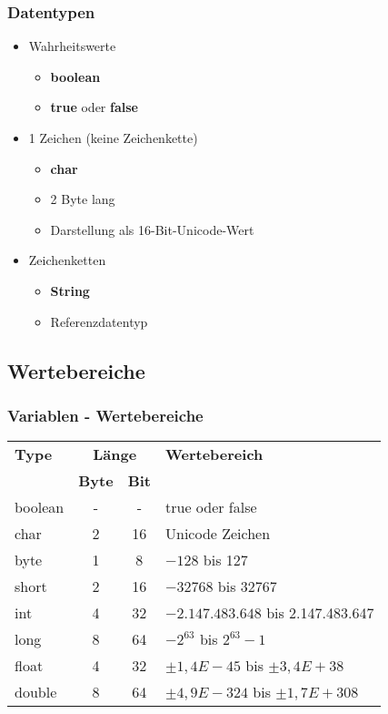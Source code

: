 \documentclass[final]{beamer}
\newcommand{\keyWord}[1]{\textbf{#1}}
\begin{document}
\begin{frame}[fragile]
  \frametitle{Datentypen}
  \begin{itemize}
    \item{Wahrheitswerte}
    \begin{itemize}
      \item{\keyWord{boolean}}
      \item{\keyWord{true} oder \keyWord{false}}
    \end{itemize}
  \end{itemize}
  \begin{itemize}
    \item{1 Zeichen (keine Zeichenkette)}
    \begin{itemize}
      \item{\keyWord{char}}
      \item{2 Byte lang}
      \item{Darstellung als 16-Bit-Unicode-Wert}
    \end{itemize}
  \end{itemize}

  \begin{itemize}
    \item Zeichenketten
    \begin{itemize}
      \item \keyWord{String}
      \item Referenzdatentyp
    \end{itemize}
  \end{itemize}
\end{frame}

\subsection{Wertebereiche}
\begin{frame}[fragile]
  \frametitle{Variablen - Wertebereiche}
  \begin{center}
    \begin{tabular}{l|c|c|l}
      \textbf{Type} & \multicolumn{2}{c|}{\textbf{Länge}} & \textbf{Wertebereich} \\
      & \textbf{Byte} &\textbf{Bit}  & \\
      \hline
      boolean & - &  - & true oder false \\
      char    & 2 & 16 & Unicode Zeichen \\
      byte    & 1 &  8 & $-128$ bis 127 \\
      short   & 2 & 16 & $-32768$ bis 32767 \\
      int     & 4 & 32 & $-2.147.483.648$ bis 2.147.483.647 \\
      long    & 8 & 64 & $-2^{63}$ bis $2^{63}-1$\\
      float   & 4 & 32 & $\pm1,4E-45$ bis $\pm3,4E+38$\\
      double  & 8 & 64 & $\pm4,9E-324$ bis $\pm1,7E+308$\\
    \end{tabular}
  \end{center}
\end{frame}
\end{document}
